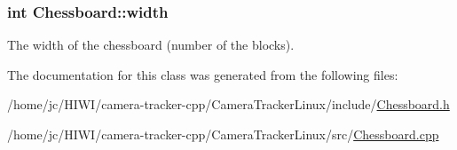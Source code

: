 \subsubsection[{\texorpdfstring{width}{width}}]{\setlength{\rightskip}{0pt plus 5cm}int Chessboard\+::width\hspace{0.3cm}{\ttfamily [private]}}\hypertarget{class_chessboard_a508e83c453e3aef8af69bdb934262d83}{}\label{class_chessboard_a508e83c453e3aef8af69bdb934262d83}
The width of the chessboard (number of the blocks). 

The documentation for this class was generated from the following files\+:\begin{DoxyCompactItemize}
\item 
/home/jc/\+H\+I\+W\+I/camera-\/tracker-\/cpp/\+Camera\+Tracker\+Linux/include/\hyperlink{_chessboard_8h}{Chessboard.\+h}\item 
/home/jc/\+H\+I\+W\+I/camera-\/tracker-\/cpp/\+Camera\+Tracker\+Linux/src/\hyperlink{_chessboard_8cpp}{Chessboard.\+cpp}\end{DoxyCompactItemize}
